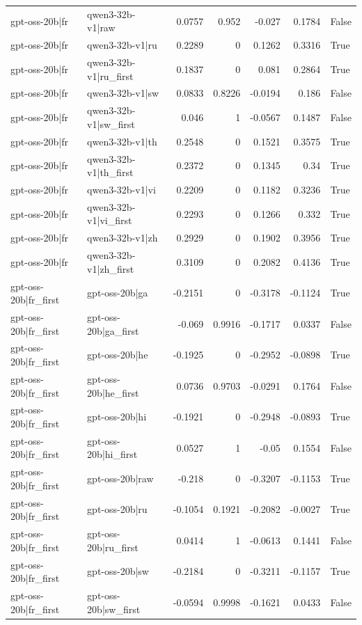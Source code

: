 \begin{table}
\begin{tabular}{l l r r r r l}
gpt-oss-20b|fr & qwen3-32b-v1|raw & 0.0757 & 0.952 & -0.027 & 0.1784 & False \\
gpt-oss-20b|fr & qwen3-32b-v1|ru & 0.2289 & 0 & 0.1262 & 0.3316 & True \\
gpt-oss-20b|fr & qwen3-32b-v1|ru_first & 0.1837 & 0 & 0.081 & 0.2864 & True \\
gpt-oss-20b|fr & qwen3-32b-v1|sw & 0.0833 & 0.8226 & -0.0194 & 0.186 & False \\
gpt-oss-20b|fr & qwen3-32b-v1|sw_first & 0.046 & 1 & -0.0567 & 0.1487 & False \\
gpt-oss-20b|fr & qwen3-32b-v1|th & 0.2548 & 0 & 0.1521 & 0.3575 & True \\
gpt-oss-20b|fr & qwen3-32b-v1|th_first & 0.2372 & 0 & 0.1345 & 0.34 & True \\
gpt-oss-20b|fr & qwen3-32b-v1|vi & 0.2209 & 0 & 0.1182 & 0.3236 & True \\
gpt-oss-20b|fr & qwen3-32b-v1|vi_first & 0.2293 & 0 & 0.1266 & 0.332 & True \\
gpt-oss-20b|fr & qwen3-32b-v1|zh & 0.2929 & 0 & 0.1902 & 0.3956 & True \\
gpt-oss-20b|fr & qwen3-32b-v1|zh_first & 0.3109 & 0 & 0.2082 & 0.4136 & True \\
gpt-oss-20b|fr_first & gpt-oss-20b|ga & -0.2151 & 0 & -0.3178 & -0.1124 & True \\
gpt-oss-20b|fr_first & gpt-oss-20b|ga_first & -0.069 & 0.9916 & -0.1717 & 0.0337 & False \\
gpt-oss-20b|fr_first & gpt-oss-20b|he & -0.1925 & 0 & -0.2952 & -0.0898 & True \\
gpt-oss-20b|fr_first & gpt-oss-20b|he_first & 0.0736 & 0.9703 & -0.0291 & 0.1764 & False \\
gpt-oss-20b|fr_first & gpt-oss-20b|hi & -0.1921 & 0 & -0.2948 & -0.0893 & True \\
gpt-oss-20b|fr_first & gpt-oss-20b|hi_first & 0.0527 & 1 & -0.05 & 0.1554 & False \\
gpt-oss-20b|fr_first & gpt-oss-20b|raw & -0.218 & 0 & -0.3207 & -0.1153 & True \\
gpt-oss-20b|fr_first & gpt-oss-20b|ru & -0.1054 & 0.1921 & -0.2082 & -0.0027 & True \\
gpt-oss-20b|fr_first & gpt-oss-20b|ru_first & 0.0414 & 1 & -0.0613 & 0.1441 & False \\
gpt-oss-20b|fr_first & gpt-oss-20b|sw & -0.2184 & 0 & -0.3211 & -0.1157 & True \\
gpt-oss-20b|fr_first & gpt-oss-20b|sw_first & -0.0594 & 0.9998 & -0.1621 & 0.0433 & False \\

\end{tabular}
\end{table}
